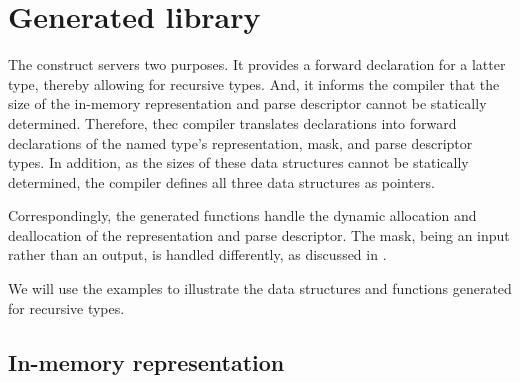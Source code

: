 

\section{Generated library}

The \Precur{} construct servers two purposes. It provides a forward
declaration for a latter \pads{} type, thereby allowing for
recursive types. And, it informs the compiler that the size of the
in-memory representation and parse descriptor cannot be statically
determined. Therefore, thec compiler translates \Precur{} declarations
into forward declarations of the named type's representation, mask, and
parse descriptor types. In addition, as the sizes of these data
structures cannot be statically determined, the compiler defines all
three data structures as pointers. 


Correspondingly, the generated
functions handle the dynamic allocation and deallocation of the
representation and parse descriptor. The mask, being an input rather
than an output, is handled differently, as discussed in
.

We will use the  examples to illustrate the data structures
and functions generated for recursive types.

\subsection{In-memory representation}
\label{sec:recur-rep}


